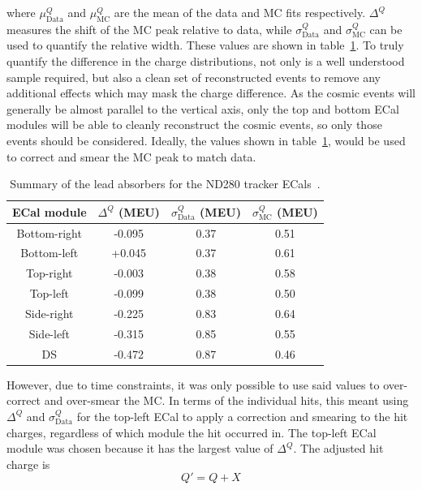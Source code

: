 where $\mu_{\textrm{Data}}^Q$ and $\mu_{\textrm{MC}}^Q$ are the mean of the data and MC fits respectively.  $\Delta^Q$ measures the shift of the MC peak relative to data, while $\sigma_{\textrm{Data}}^{Q}$ and $\sigma_{\textrm{MC}}^{Q}$ can be used to quantify the relative width.  These values are shown in table~\ref{table:HitChargeFitValues}.  To truly quantify the difference in the charge distributions, not only is a well understood sample required, but also a clean set of reconstructed events to remove any additional effects which may mask the charge difference.  As the cosmic events will generally be almost parallel to the vertical axis, only the top and bottom ECal modules will be able to cleanly reconstruct the cosmic events, so only those events should be considered.  Ideally, the values shown in table~\ref{table:HitChargeFitValues}, would be used to correct and smear the MC peak to match data.  
\begin{table}
  \begin{tabular}{ c c c c }
   ECal module & $\Delta^{Q}$ (MEU) & $\sigma_{\textrm{Data}}^Q$ (MEU) & $\sigma_{\textrm{MC}}^Q$ (MEU) \\ \hline \hline
   Bottom-right & -0.095 & 0.37 & 0.51 \\
   Bottom-left & +0.045 & 0.37 & 0.61 \\
   Top-right & -0.003 & 0.38 & 0.58 \\
   Top-left & -0.099 & 0.38 & 0.50 \\ \hline
   Side-right & -0.225 & 0.83 & 0.64 \\
   Side-left & -0.315 & 0.85 & 0.55 \\
   DS & -0.472 & 0.87 & 0.46 \\
  \end{tabular}
  \caption{Summary of the lead absorbers for the ND280 tracker ECals~\cite{1748-0221-8-10-P10019}.}
  \label{table:HitChargeFitValues}
\end{table}
However, due to time constraints, it was only possible to use said values to over-correct and over-smear the MC.  In terms of the individual hits, this meant using $\Delta^{Q}$ and $\sigma_{\textrm{Data}}^Q$ for the top-left ECal to apply a correction and smearing to the hit charges, regardless of which module the hit occurred in.  The top-left ECal module was chosen because it  has the largest value of $\Delta^{Q}$.  The adjusted hit charge is
\begin{equation}
Q' = Q + X
\label{eqn:HitChargeCorrection}
\end{equation}

